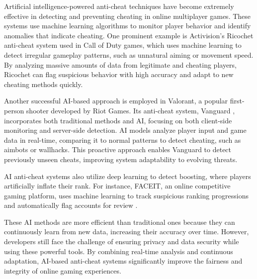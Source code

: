 Artificial intelligence-powered anti-cheat techniques have become extremely effective in detecting and preventing cheating in online multiplayer games. These systems use machine learning algorithms to monitor player behavior and identify anomalies that indicate cheating. One prominent example is Activision's Ricochet anti-cheat system \cite{doi:10.1080/10447318.2023.2204276} used in Call of Duty games, which uses machine learning to detect irregular gameplay patterns, such as unnatural aiming or movement speed. By analyzing massive amounts of data from legitimate and cheating players, Ricochet can flag suspicious behavior with high accuracy and adapt to new cheating methods quickly.

Another successful AI-based approach is employed in Valorant, a popular first-person shooter developed by Riot Games. Its anti-cheat system, Vanguard \cite{bohnerthanti}, incorporates both traditional methods and AI, focusing on both client-side monitoring and server-side detection. AI models analyze player input and game data in real-time, comparing it to normal patterns to detect cheating, such as aimbots or wallhacks. This proactive approach enables Vanguard to detect previously unseen cheats, improving system adaptability to evolving threats.

AI anti-cheat systems also utilize deep learning to detect boosting, where players artificially inflate their rank. For instance, FACEIT, an online competitive gaming platform, uses machine learning to track suspicious ranking progressions and automatically flag accounts for review \cite{faceitanticheat}. 

These AI methods are more efficient than traditional ones because they can continuously learn from new data, increasing their accuracy over time. However, developers still face the challenge of ensuring privacy and data security while using these powerful tools. By combining real-time analysis and continuous adaptation, AI-based anti-cheat systems significantly improve the fairness and integrity of online gaming experiences.
